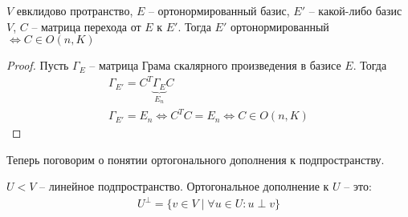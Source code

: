 \begin{theorem-non}
    $V$ евклидово протранство, $E$ -- ортонормированный базис, $E'$ -- какой-либо базис $V$,
    $C$ -- матрица перехода от $E$ к $E'$. Тогда $E'$ ортонормированный $\Longleftrightarrow C \in O(n, K)$ 
\end{theorem-non}
\begin{proof}
    Пусть $\Gamma_E$ -- матрица Грама скалярного произведения в базисе $E$. Тогда
    \begin{gather*}
        \Gamma_{E'} = C^T \underbrace{\Gamma_E}_{E_n} C \\ 
        \Gamma_{E'} = E_n \Longleftrightarrow C^T C = E_n \Longleftrightarrow C \in O(n, K)
    \end{gather*} 
\end{proof}

Теперь поговорим о понятии ортогонального дополнения к подпространству. 
\begin{conj}
    $U < V$ -- линейное подпространство. Ортогональное дополнение к $U$ -- это: 
    \begin{gather*}
        U^\perp = \{ v \in V \mid \forall u \in U : u \perp v \}
    \end{gather*}
\end{conj}

